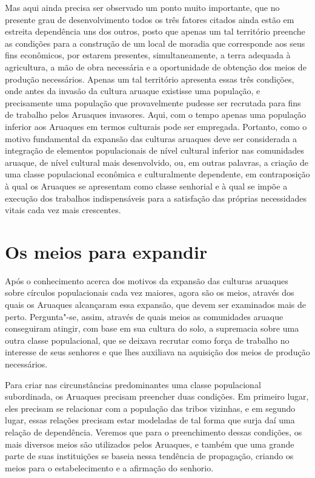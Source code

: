 Mas aqui ainda precisa ser observado um ponto muito importante, que no
presente grau de desenvolvimento todos os três fatores citados ainda
estão em estreita dependência uns dos outros, posto que apenas um tal
território preenche as condições para a construção de um local de
moradia que corresponde aos seus fins econômicos, por estarem presentes,
simultaneamente, a terra adequada à agricultura, a mão de obra
necessária e a oportunidade de obtenção dos meios de produção
necessários. Apenas um tal território apresenta essas três condições,
onde antes da invasão da cultura aruaque existisse uma população, e
precisamente uma população que provavelmente pudesse ser recrutada para
fins de trabalho pelos Aruaques invasores. Aqui, com o tempo apenas uma
população inferior aos Aruaques em termos culturais pode ser empregada.
Portanto, como o motivo fundamental da expansão das culturas aruaques
deve ser considerada a integração de elementos populacionais de nível
cultural inferior nas comunidades aruaque, de nível cultural mais
desenvolvido, ou, em outras palavras, a criação de uma classe
populacional econômica e culturalmente dependente, em contraposição à
qual os Aruaques se apresentam como classe senhorial
e à qual se impõe a execução dos trabalhos
indispensáveis para a satisfação das próprias necessidades vitais cada
vez mais crescentes.

\chapter*{Os meios para expandir\smallskip{}}

Após o conhecimento acerca dos motivos da expansão das
culturas aruaques sobre círculos populacionais cada vez maiores, agora
são os meios, através dos quais os Aruaques alcançaram essa expansão,
que devem ser examinados mais de perto. Pergunta"-se, assim, através de quais
meios as comunidades aruaque conseguiram atingir, com base em sua
cultura do solo, a supremacia sobre uma outra classe populacional,
que se deixava recrutar como força de trabalho no interesse de seus
senhores e que lhes auxiliava na aquisição dos meios de produção
necessários. 

Para criar nas circunstâncias predominantes uma classe
populacional subordinada, os Aruaques precisam preencher duas condições.
Em primeiro lugar, eles precisam se relacionar com a população das
tribos vizinhas, e em segundo lugar, essas relações precisam estar
modeladas de tal forma que surja daí uma relação de dependência.
Veremos que para o preenchimento dessas condições, os mais diversos
meios são utilizados pelos Aruaques, e também que uma grande parte de
suas instituições se baseia nessa tendência de propagação, criando os
meios para o estabelecimento e a afirmação do senhorio.

